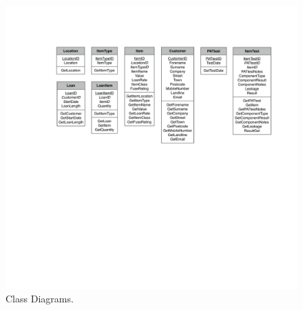 \begin{landscape}
\begin{figure}[H]
    \centerline{\includegraphics[width=450px]{./Design/Class_Definitions/Class_definitions.pdf}}
    \caption{Class Diagrams.} \label{fig:relationship_diagram}
\end{figure}


\end{landscape}

\newpage

